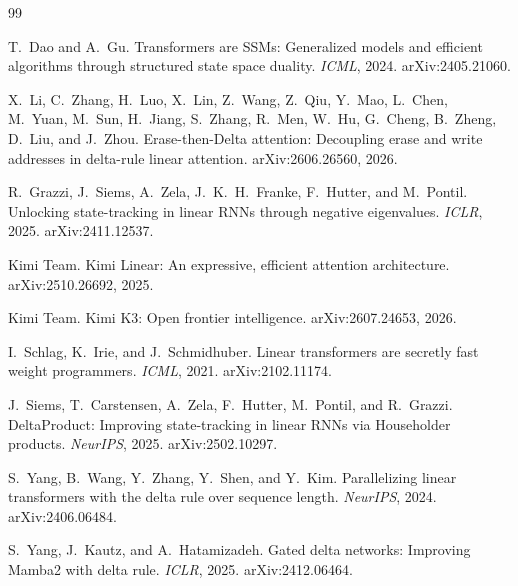 \documentclass[10pt,twocolumn]{article}
\begin{document}
\small
\begin{thebibliography}{99}

T.~Dao and A.~Gu.
\newblock Transformers are SSMs: Generalized models and efficient algorithms
through structured state space duality.
\newblock \emph{ICML}, 2024. arXiv:2405.21060.

X.~Li, C.~Zhang, H.~Luo, X.~Lin, Z.~Wang, Z.~Qiu, Y.~Mao, L.~Chen, M.~Yuan,
M.~Sun, H.~Jiang, S.~Zhang, R.~Men, W.~Hu, G.~Cheng, B.~Zheng, D.~Liu, and
J.~Zhou.
\newblock Erase-then-Delta attention: Decoupling erase and write addresses in
delta-rule linear attention.
\newblock arXiv:2606.26560, 2026.

R.~Grazzi, J.~Siems, A.~Zela, J.~K.~H.~Franke, F.~Hutter, and M.~Pontil.
\newblock Unlocking state-tracking in linear RNNs through negative eigenvalues.
\newblock \emph{ICLR}, 2025. arXiv:2411.12537.

Kimi Team.
\newblock Kimi Linear: An expressive, efficient attention architecture.
\newblock arXiv:2510.26692, 2025.

Kimi Team.
\newblock Kimi K3: Open frontier intelligence.
\newblock arXiv:2607.24653, 2026.

I.~Schlag, K.~Irie, and J.~Schmidhuber.
\newblock Linear transformers are secretly fast weight programmers.
\newblock \emph{ICML}, 2021. arXiv:2102.11174.

J.~Siems, T.~Carstensen, A.~Zela, F.~Hutter, M.~Pontil, and R.~Grazzi.
\newblock DeltaProduct: Improving state-tracking in linear RNNs via Householder
products.
\newblock \emph{NeurIPS}, 2025. arXiv:2502.10297.

S.~Yang, B.~Wang, Y.~Zhang, Y.~Shen, and Y.~Kim.
\newblock Parallelizing linear transformers with the delta rule over sequence
length.
\newblock \emph{NeurIPS}, 2024. arXiv:2406.06484.

S.~Yang, J.~Kautz, and A.~Hatamizadeh.
\newblock Gated delta networks: Improving Mamba2 with delta rule.
\newblock \emph{ICLR}, 2025. arXiv:2412.06464.

\end{thebibliography}
\end{document}
